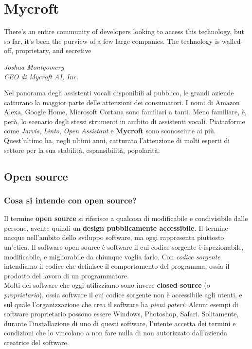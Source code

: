 \chapter{Mycroft}
\label{chap:mycroft}
\epigraph{There’s an entire community of developers looking to access this technology, but so far, it’s been the purview of a few large companies. The technology is walled-off, proprietary, and secretive}{\textit{Joshua Montgomery \\ CEO di Mycroft AI, Inc.}}
Nel panorama degli assistenti vocali disponibili al pubblico, le grandi aziende catturano la maggior parte delle attenzioni dei consumatori. I nomi di Amazon Alexa, Google Home, Microsoft Cortana sono familiari a tanti. Meno familiare, è, però, lo scenario degli stessi strumenti in ambito di assistenti vocali. Piattaforme come \textit{Jarvis}, \textit{Linto}, \textit{Open Assistant} e \textbf{Mycroft} sono sconosciute ai più. Quest'ultimo ha, negli ultimi anni, catturato l'attenzione di molti esperti di settore per la sua stabilità, espansibilità, popolarità.
\section{Open source}
\subsection{Cosa si intende con open source?}
Il termine \textbf{open source} si riferisce a qualcosa di modificabile e condivisibile dalle persone, avente quindi un \textbf{design pubblicamente accessibile.} Il termine nacque nell'ambito dello sviluppo software, ma oggi rappresenta piuttosto un'etica. Il software open source è software il cui codice sorgente è ispezionabile, modificabile, e migliorabile da chiunque voglia farlo. Con \textit{codice sorgente} intendiamo il codice che definisce il comportamento del programma, ossia il prodotto del lavoro di un programmatore. \\
Molti dei software che oggi utilizziamo sono invece \textbf{closed source} (o \textit{proprietario}), ossia software il cui codice sorgente non è accessibile agli utenti, e sul quale l'organizzazione che crea il software ha \textit{pieni poteri}. Alcuni esempi di software proprietario possono essere Windows, Photoshop, Safari. Solitamente, durante l'installazione di uno di questi software, l'utente accetta dei termini e condizioni che lo vincolano a non fare nulla di non autorizzato dall'azienda creatrice del software.
